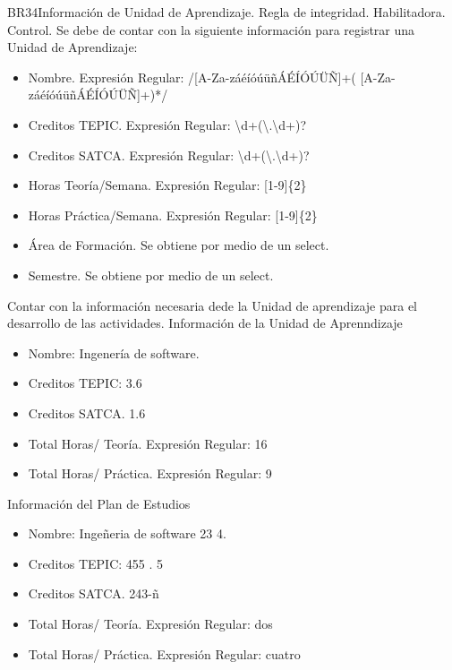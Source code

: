 \begin{BussinesRule}{BR34}{Información de Unidad de Aprendizaje.}
	\BRitem[Tipo:] Regla de integridad.
	\BRitem[Clase:] Habilitadora.
	\BRitem[Nivel:] Control.
	\BRitem[Descripción:]Se debe de contar con la siguiente información para registrar una Unidad de Aprendizaje:
	\begin{itemize}
		\item Nombre. Expresión Regular: /[A-Za-záéíóúüñÁÉÍÓÚÜÑ]+( [A-Za-záéíóúüñÁÉÍÓÚÜÑ]+)*/
		\item Creditos TEPIC. Expresión Regular: \textbackslash d+(\textbackslash.\textbackslash d+)?
		\item Creditos SATCA. Expresión Regular: \textbackslash d+(\textbackslash.\textbackslash d+)?
		\item Horas Teoría/Semana. Expresión Regular: [1-9]\{2\}
		\item Horas Práctica/Semana. Expresión Regular: [1-9]\{2\}
		\item Área de Formación. Se obtiene por medio de un select.
		\item Semestre. Se obtiene por medio de un select.
	\end{itemize}
	\BRitem[Motivación:] Contar con la información necesaria dede la Unidad de aprendizaje para el desarrollo de las actividades.
	 Información de la Unidad de Aprenndizaje
	\begin{itemize}
		\item Nombre: Ingenería de software.
		\item Creditos TEPIC: 3.6
		\item Creditos SATCA. 1.6
		\item Total Horas/ Teoría. Expresión Regular: 16
		\item Total Horas/ Práctica. Expresión Regular: 9
	\end{itemize}
	 Información del Plan de Estudios
	\begin{itemize}
		\item Nombre: Ingeñeria de software 23 4.
		\item Creditos TEPIC: 455 . 5
		\item Creditos SATCA. 243-ñ
		\item Total Horas/ Teoría. Expresión Regular: dos
		\item Total Horas/ Práctica. Expresión Regular: cuatro
	\end{itemize}
\end{BussinesRule}

